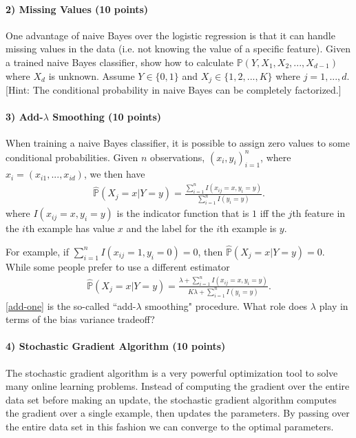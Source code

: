 \documentclass[11pt]{article}
\begin{document}
\paragraph{2) Missing Values (10 points)} 

One advantage of naive Bayes over the logistic regression is that it can handle missing values in the data (i.e. not knowing the value of a specific feature). Given a trained naive Bayes classifier, show how to calculate $\mathbb{P}(Y, X_1, X_2, ..., X_{d-1})$ where $X_d$ is unknown. Assume $Y \in \{0,1\}$ and $X_j \in \{1,2,...,K\}$ where $j=1,...,d$. [Hint: The conditional probability in naive Bayes can be completely factorized.]

\paragraph{3) Add-$\lambda$ Smoothing (10 points)} 

When training a naive Bayes classifier, it is possible to assign zero values to some conditional probabilities. Given $n$ observations, $(x_i,y_i)_{i=1}^n$, where $x_i = (x_{i1},...,x_{id})$, we then have
\begin{align}\label{original-one}
\hat{\mathbb{P}}(X_j=x|Y=y) = \frac{\sum_{i=1}^nI(x_{ij}=x,y_i=y)}{\sum_{i=1}^nI(y_i=y)}.
\end{align}
where $I(x_{ij}=x,y_i=y)$ is the indicator function that is $1$ iff the $j$th feature in the $i$th example has value $x$ and the label for the $i$th example is $y$.

For example, if $\sum_{i=1}^nI(x_{ij}=1,y_i=0)=0$, then $\hat{\mathbb{P}}(X_j=x|Y=y) = 0$. While some people prefer to use a different estimator
\begin{align}\label{add-one}
\hat{\mathbb{P}}(X_j=x|Y=y) = \frac{\lambda+\sum_{i=1}^nI(x_{ij}=x,y_i=y)}{K\lambda+\sum_{i=1}^nI(y_i=y)}.
\end{align}
\eqref{add-one} is the so-called ``add-$\lambda$ smoothing" procedure. What role does $\lambda$ play in terms of the bias variance tradeoff? 

\paragraph{4) Stochastic Gradient Algorithm (10 points)}

The stochastic gradient algorithm is a very powerful optimization tool to solve many online learning problems. Instead of computing the gradient over the entire data set before making an update, the stochastic gradient algorithm computes the gradient over a single example, then updates the parameters. By passing over the entire data set in this fashion we can converge to the optimal parameters.
\end{document}
